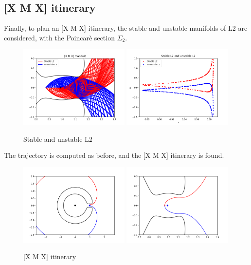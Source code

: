 \documentclass{report}
\begin{document}
\subsection*{[X M X] itinerary}
Finally, to plan an [X M X] itinerary, the stable and unstable manifolds of L2 are considered, with the Poincarè section $\Sigma_2$.
\begin{figure}[h]
    \centering
    \includegraphics[width=0.49\textwidth]{images/manifold_XMX.png}
    \includegraphics[width=0.49\textwidth]{images/XMX_xu.png}
    \caption{Stable and unstable L2}
\end{figure}
The trajectory is computed as before, and the [X M X] itinerary is found.
\begin{figure}[h]
    \centering
    \includegraphics[width=0.49\textwidth]{images/XMX_traj.png}
    \includegraphics[width=0.49\textwidth]{images/XMX_traj_z.png}
    \caption{[X M X] itinerary}
\end{figure}
\end{document}
